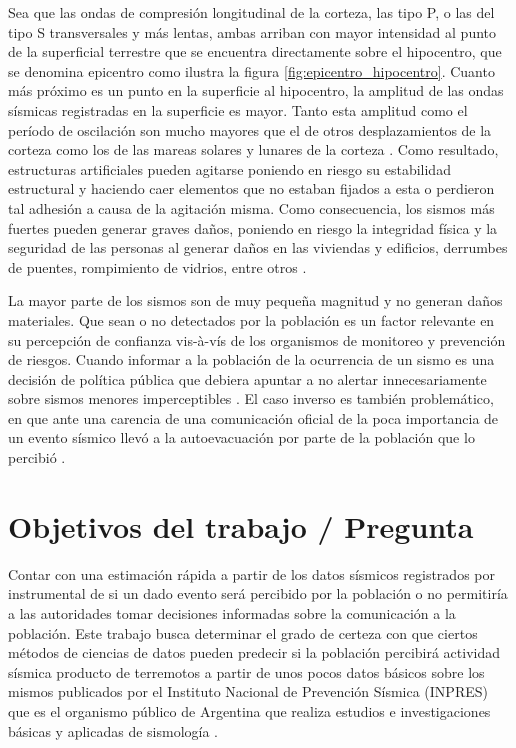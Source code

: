 \documentclass[a4paper]{report}
\begin{document}
Sea que las ondas de compresión longitudinal de la corteza, las tipo P, o las del tipo S transversales y más lentas, ambas arriban con mayor intensidad al punto de la superficial terrestre que se encuentra directamente sobre el hipocentro, que se denomina epicentro \cite[sección 4.1.2]{fowler_solid_1990} como ilustra la figura \ref{fig:epicentro_hipocentro}.
Cuanto más próximo es un punto en la superficie al hipocentro, la amplitud de las ondas sísmicas registradas en la superficie es mayor.
Tanto esta amplitud como el período de oscilación son mucho mayores que el de otros desplazamientos de la corteza como los de las mareas solares y lunares de la corteza \cite[sección 4.1.4]{fowler_solid_1990}.
Como resultado, estructuras artificiales pueden agitarse poniendo en riesgo su estabilidad estructural y haciendo caer elementos que no estaban fijados a esta o perdieron tal adhesión a causa de la agitación misma.
Como consecuencia, los sismos más fuertes pueden generar graves daños, poniendo en riesgo la integridad física y la seguridad de las personas al generar daños en las viviendas y edificios, derrumbes de puentes, rompimiento de vidrios, entre otros \cite{noauthor_que_2018}.

La mayor parte de los sismos son de muy pequeña magnitud y no generan daños materiales.
Que sean o no detectados por la población es un factor relevante en su percepción de confianza vis-à-vís de los organismos de monitoreo y prevención de riesgos.
Cuando informar a la población de la ocurrencia de un sismo es una decisión de política pública que debiera apuntar a no alertar innecesariamente sobre sismos menores imperceptibles \cite{saunders_j_k_twist_nodate}.
El caso inverso es también problemático, en que ante una carencia de una comunicación oficial de la poca importancia de un evento sísmico llevó a la autoevacuación por parte de la población que lo percibió \cite{vaiciulyte_population_2022}. 


\section{Objetivos del trabajo / Pregunta}\label{sec:objetivo}

Contar con una estimación rápida a partir de los datos sísmicos registrados por instrumental de si un dado evento será percibido por la población o no permitiría a las autoridades tomar decisiones informadas sobre la comunicación a la población.
Este trabajo busca determinar el grado de certeza con que ciertos métodos de ciencias de datos pueden predecir si la población percibirá actividad sísmica producto de terremotos a partir de unos pocos datos básicos sobre los mismos publicados por el Instituto Nacional de Prevención Sísmica (INPRES) que es el organismo público de Argentina que realiza estudios e investigaciones básicas y aplicadas de sismología \cite{noauthor_instituto_2022}.
\end{document}
